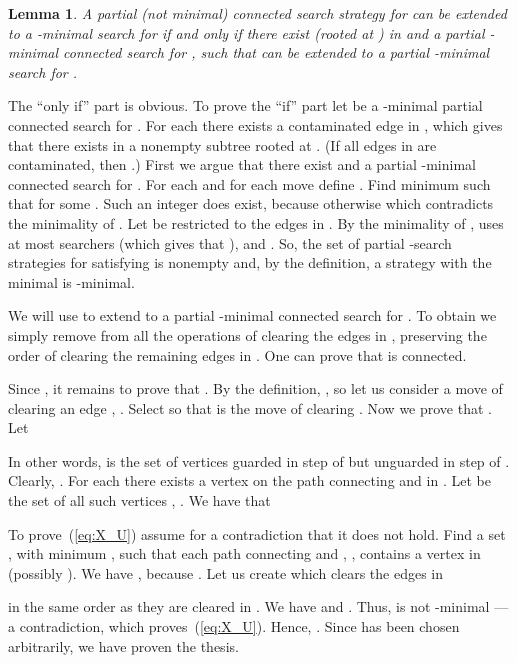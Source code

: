 \documentclass[10pt]{article}
\newenvironment{proof}[1][Proof]
{\par\noindent{\bf #1:} }{\hspace*{\fill}\nolinebreak{}\bigskip\par}
\newtheorem{lemma}{Lemma}
\begin{document}
\begin{lemma} \label{lem:minimal_S_v}
A partial (not minimal) connected search strategy  for  can be extended to a -minimal search for  if and only if there exist  (rooted at ) in  and a partial -minimal connected search  for , such that  can be extended to a partial -minimal search for .
\end{lemma}
\begin{proof}
The ``only if'' part is obvious. To prove the ``if'' part let  be a -minimal partial connected search for . For each  there exists a contaminated edge in , which gives that there exists in  a nonempty subtree  rooted at . (If all edges in  are contaminated, then .) First we argue that there exist  and a partial -minimal connected search  for . For each  and for each move  define . Find minimum  such that  for some . Such an integer  does exist, because otherwise  which contradicts the minimality of . Let  be  restricted to the edges in . By the minimality of ,  uses at most  searchers (which gives that ), and . So, the set of partial -search strategies  for  satisfying  is nonempty and, by the definition, a strategy  with the minimal  is -minimal.

We will use  to extend  to a partial -minimal connected search  for . To obtain  we simply remove from  all the operations of clearing the edges in , preserving the order of clearing the remaining edges in . One can prove that  is connected.

Since , it remains to prove that . By the definition, , so let us consider a move  of clearing an edge , . Select  so that  is the move of clearing . Now we prove that . Let

In other words,  is the set of vertices guarded in step  of  but unguarded in step  of . Clearly, . For each  there exists a vertex  on the path connecting  and  in . Let  be the set of all such vertices , . We have that

To prove~(\ref{eq:X_U}) assume for a contradiction that it does not hold. Find a set , with minimum , such that each path connecting  and , , contains a vertex in  (possibly ). We have , because . Let us create  which clears the edges in

in the same order as they are cleared in . We have  and . Thus,  is not -minimal --- a contradiction, which proves~(\ref{eq:X_U}). Hence, . Since  has been chosen arbitrarily, we have proven the thesis.
\end{proof}
\end{document}
